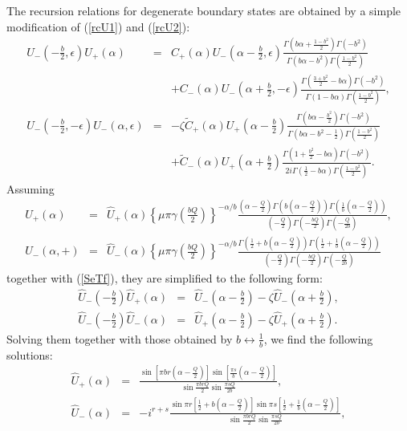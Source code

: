 \documentclass[a4paper,12pt]{article}
\newcommand{\tfrac}[2]{{\textstyle\frac{#1}{#2}}}
\newcommand{\ep}{{\epsilon}}
\begin{document}
   The recursion relations for degenerate boundary states are
 obtained by a simple modification of (\ref{rcU1}) and (\ref{rcU2}):
\begin{eqnarray} 
 U_-(-\tfrac{b}{2},\ep)U_+(\alpha)
 &=&  C_+(\alpha)U_-(\alpha-\tfrac{b}{2},\ep)
  \frac{\Gamma(b\alpha+\frac{1-b^2}{2})\Gamma(-b^2)}
       {\Gamma(b\alpha-b^2)\Gamma(\frac{1-b^2}{2})}
 ~~~~
 \nonumber \\ &&
  +C_-(\alpha)U_-(\alpha+\tfrac{b}{2},-\ep)
  \frac{\Gamma(\frac{3+b^2}{2}-b\alpha)\Gamma(-b^2)}
       {\Gamma(1-b\alpha)\Gamma(\frac{1-b^2}{2})}
 ,\nonumber \\
 U_-(-\tfrac{b}{2},-\ep)U_-(\alpha,\ep)
 &=&
  -\zeta\tilde{C}_+(\alpha) U_+(\alpha-\tfrac{b}{2})
  \frac{\Gamma(b\alpha-\frac{b^2}{2})\Gamma(-b^2)}
       {\Gamma(b\alpha-b^2-\frac{1}{2})\Gamma(\frac{1-b^2}{2})}
 \nonumber \\ &&
  +\tilde{C}_-(\alpha)U_+(\alpha+\tfrac{b}{2})
  \frac{\Gamma(1+\frac{b^2}{2}-b\alpha)\Gamma(-b^2)}
       {2i\Gamma(\frac{1}{2}-b\alpha)\Gamma(\frac{1-b^2}{2})}.
\label{rcU3}
\end{eqnarray}
 Assuming
\begin{eqnarray}
 U_+(\alpha) &=& \hat{U}_+(\alpha)
  \left\{\mu\pi\gamma(\tfrac{bQ}{2})\right\}^{-\alpha/b}
  \frac{(\alpha-\frac{Q}{2})
        \Gamma(b(\alpha-\frac{Q}{2}))
        \Gamma(\frac{1}{b}(\alpha-\frac{Q}{2}))}
       {(-\frac{Q}{2})\Gamma(-\frac{bQ}{2})\Gamma(-\frac{Q}{2b})},
 \nonumber \\
 U_-(\alpha,+) &=& \hat{U}_-(\alpha)
  \left\{\mu\pi\gamma(\tfrac{bQ}{2})\right\}^{-\alpha/b}
  \frac{\Gamma(\frac{1}{2}+b(\alpha-\frac{Q}{2}))
        \Gamma(\frac{1}{2}+\frac{1}{b}(\alpha-\frac{Q}{2}))}
       {(-\frac{Q}{2})\Gamma(-\frac{bQ}{2})\Gamma(-\frac{Q}{2b})}
\end{eqnarray}
 together with (\ref{SeTf}), they are simplified to the following form:
\begin{eqnarray} 
  \hat{U}_-(-\tfrac{b}{2})\hat{U}_+(\alpha)
 &=& \hat{U}_-(\alpha-\tfrac{b}{2})
     -\zeta \hat{U}_-(\alpha+\tfrac{b}{2}) ,\nonumber \\
  \hat{U}_-(-\tfrac{b}{2})\hat{U}_-(\alpha)
 &=& \hat{U}_+(\alpha-\tfrac{b}{2})
     -\zeta \hat{U}_+(\alpha+\tfrac{b}{2}).
\end{eqnarray}
 Solving them together with those obtained by
 $b\leftrightarrow \tfrac{1}{b}$, we find the following solutions:
\begin{eqnarray}
  \hat{U}_+(\alpha) &=&
  \frac{\sin[\pi br(\alpha-\frac{Q}{2})]
        \sin[\frac{\pi s}{b}(\alpha-\frac{Q}{2})]}
       {\sin\frac{\pi brQ}{2}\sin\frac{\pi sQ}{2b}},
 \nonumber\\
  \hat{U}_-(\alpha) &=& -i^{r+s}
  \frac{\sin\pi r[\frac{1}{2}+b(\alpha-\frac{Q}{2})]
        \sin\pi s[\frac{1}{2}+\frac{1}{b}(\alpha-\frac{Q}{2})]}
       {\sin\frac{\pi brQ}{2}\sin\frac{\pi sQ}{2b}},
\end{eqnarray}
\end{document}
